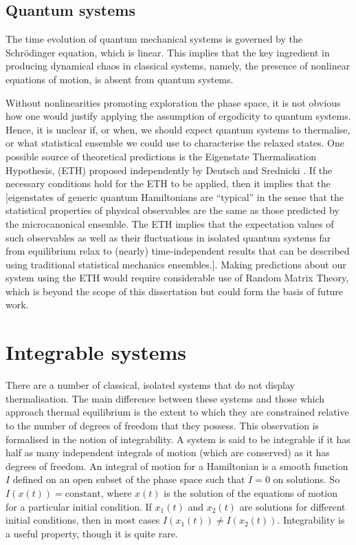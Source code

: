 \documentclass[a4paper, 10pt]{article}
\theoremstyle{plain}
\begin{document}
\subsection{Quantum systems}

The time evolution of quantum mechanical systems is governed by the
Schr\"odinger equation, which is linear. This implies that the key ingredient
in producing dynamical chaos in classical systems, namely, the presence of
nonlinear equations of motion, is absent from quantum systems.

Without nonlinearities promoting exploration the phase space, it is
not obvious how one would justify applying the assumption of ergodicity to
quantum systems. Hence, it is unclear if, or when, we should expect quantum systems to
thermalise, or what statistical ensemble we could use to characterise the
relaxed states. One possible source of theoretical predictions is the
Eigenstate Thermalisation Hypothesis, (ETH) proposed independently by Deutsch
\cite{Deutsch1991} and Srednicki \cite{Srednicki1994}. If the necessary
conditions hold for the ETH to be applied, then it implies that the [eigenstates
of generic quantum Hamiltonians are “typical” in the sense that the statistical
properties of physical observables are the same as those predicted by the
microcanonical ensemble. The ETH implies that the expectation values
of such observables as well as their fluctuations in isolated quantum systems
far from equilibrium relax to (nearly) time-independent results that can be
described using traditional statistical mechanics ensembles.]. Making predictions
about our system using the ETH would require considerable use of Random Matrix
Theory, which is beyond the scope of this dissertation but could form the basis
of future work.


\section{Integrable systems}

There are a number of classical, isolated systems that do not display
thermalisation. The main difference between these systems and those which
approach thermal equilibrium is the extent to which they are constrained
relative to the number of degrees of freedom that they possess. This observation
is formalised in the notion of integrability. A system is said to be integrable
if it has half as many independent integrals of motion (which are conserved)
as it has degrees of freedom. An integral of motion for a Hamiltonian is a
smooth function $I$ defined on an open subset of the phase space such that
$\dot{I}=0$ on solutions. So $I(x(t))=\text{constant}$, where $x(t)$ is the
solution of the equations of motion for a particular initial condition. If
$x_1(t)$ and $x_2(t)$ are solutions for different initial conditions, then in
most cases $I(x_1(t))\ne I(x_2(t))$. Integrability is a useful property, though
it is quite rare.
\end{document}
